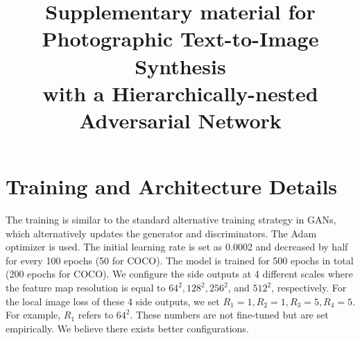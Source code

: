 \documentclass[10pt, letterpaper]{article}
\begin{document}

\title{Supplementary material for Photographic Text-to-Image Synthesis \\ with a Hierarchically-nested Adversarial Network}

\maketitle




\section{Training and Architecture Details}
The training is similar to the standard alternative training strategy in GANs, which alternatively updates the generator and discriminators.
The Adam optimizer \cite{kingma2014adam} is used.  The initial learning rate is set as 0.0002 and decreased by half for every 100 epochs (50 for COCO). The model is trained for 500 epochs in total (200 epochs for COCO).
We configure  the side outputs at 4 different scales where the feature map resolution is equal to $64^2,128^2,256^2$, and $512^2$, respectively.
For the local image loss of these 4 side outputs, we set $R_1=1, R_2=1, R_3=5, R_4=5$. For example, $R_1$ refers to $64^2$. These numbers are not fine-tuned but are set empirically. We believe there exists better configurations.
\end{document}

